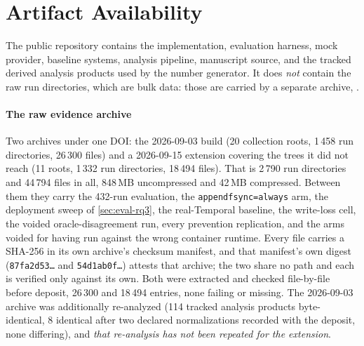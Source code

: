 \section{Artifact Availability}
\label{sec:artifact}

The public repository \artifactavail{} contains the implementation, evaluation
harness, mock provider, baseline systems, analysis pipeline, manuscript source,
and the tracked derived analysis products used by the number generator. It does
\emph{not} contain the raw run directories, which are bulk data: those are
carried by a separate archive, \archiveavail{}.

\paragraph{The raw evidence archive} Two archives under one DOI: the
2026-09-03 build (20 collection roots, 1\,458 run directories, 26\,300
files) and a 2026-09-15 extension covering the trees it did not reach (11
roots, 1\,332 run directories, 18\,494 files). That is 2\,790 run directories
and 44\,794 files in all, 848\,MB uncompressed and 42\,MB compressed. Between
them they carry the 432-run evaluation, the \texttt{appendfsync=always} arm,
the deployment sweep of \cref{sec:eval-rq3}, the real-Temporal baseline, the
write-loss cell, the voided oracle-disagreement run, every prevention
replication, and the arms voided for having run against the wrong container
runtime. Every file carries a SHA-256 in its own archive's
checksum manifest, and that manifest's own digest
(\texttt{87fa2d53\ldots} and \texttt{54d1ab0f\ldots}) attests that archive;
the two share no path and each is verified only against its own. Both were
extracted and checked file-by-file before deposit, 26\,300 and 18\,494
entries, none failing or missing. The 2026-09-03 archive was additionally
re-analyzed (114 tracked analysis products byte-identical, 8 identical
after two declared normalizations recorded with the deposit, none differing),
and \emph{that re-analysis has not been repeated for the extension}.
